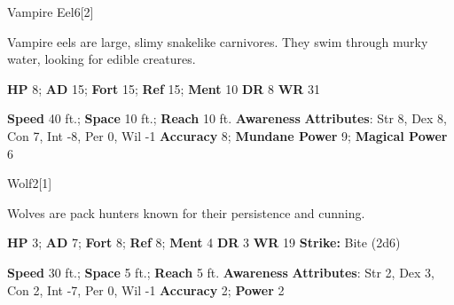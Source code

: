   \begin{monsection}{Vampire Eel}{6}[2]
    \vspace{-1em}\vspace{-1em}
    \vspace{0em}

    
      Vampire eels are large, slimy snakelike carnivores.
      They swim through murky water, looking for edible creatures.
    

    \begin{spellcontent}
      \begin{spelltargetinginfo}
        \pari \textbf{HP} 8;
          \textbf{AD} 15;
          \textbf{Fort} 15;
          \textbf{Ref} 15;
          \textbf{Ment} 10
        \pari \textbf{DR} 8
        \pari \textbf{WR} 31
        
      \end{spelltargetinginfo}
    \end{spellcontent}
    \begin{monsterfooter}
      \pari \textbf{Speed} 40 ft.;
        \textbf{Space} 10 ft.;
        \textbf{Reach} 10 ft.
      \pari \textbf{Awareness} 
      \pari \textbf{Attributes}:
        Str 8, Dex 8,
        Con 7, Int -8,
        Per 0, Wil -1
      \pari \textbf{Accuracy} 8;
        \textbf{Mundane Power} 9;
      \textbf{Magical Power} 6
    \end{monsterfooter}
  \end{monsection}
  
  
  \begin{monsection}{Wolf}{2}[1]
    \vspace{-1em}\vspace{-1em}
    \vspace{0em}

    
      Wolves are pack hunters known for their persistence and cunning.
    

    \begin{spellcontent}
      \begin{spelltargetinginfo}
        \pari \textbf{HP} 3;
          \textbf{AD} 7;
          \textbf{Fort} 8;
          \textbf{Ref} 8;
          \textbf{Ment} 4
        \pari \textbf{DR} 3
        \pari \textbf{WR} 19
        \pari \textbf{Strike:}
            Bite  (2d6)
      \end{spelltargetinginfo}
    \end{spellcontent}
    \begin{monsterfooter}
      \pari \textbf{Speed} 30 ft.;
        \textbf{Space} 5 ft.;
        \textbf{Reach} 5 ft.
      \pari \textbf{Awareness} 
      \pari \textbf{Attributes}:
        Str 2, Dex 3,
        Con 2, Int -7,
        Per 0, Wil -1
      \pari \textbf{Accuracy} 2;
        \textbf{Power} 2
    \end{monsterfooter}
  \end{monsection}
  
